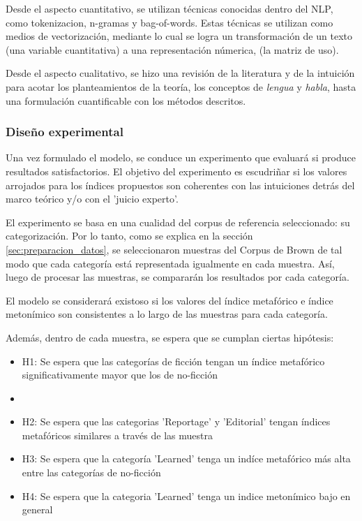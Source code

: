 \documentclass[twoside]{article}
\begin{document}
Desde el aspecto cuantitativo, se utilizan técnicas conocidas
dentro del NLP, como tokenizacion, n-gramas y  bag-of-words.
Estas técnicas se utilizan como medios de vectorización, mediante
lo cual se logra un transformación de un texto (una variable cuantitativa)
a una representación númerica, (la matriz de uso).

Desde el aspecto cualitativo, se hizo una revisión de la literatura y de la intuición
para acotar los planteamientos de la teoría, los conceptos de \emph{lengua} y \emph{habla}, hasta
una formulación cuantificable con los métodos descritos.




\subsubsection{Diseño experimental}
\label{sec:orgce47475}

Una vez formulado el modelo, se conduce un experimento que evaluará si produce resultados
satisfactorios. El objetivo del experimento es escudriñar si los valores arrojados para
los índices propuestos son coherentes con las intuiciones detrás del marco teórico y/o
con el 'juicio experto'.

El experimento se basa en una cualidad del corpus de referencia seleccionado: su categorización.
Por lo tanto, como se explica en la sección \ref{sec:preparacion_datos}, se seleccionaron
muestras del Corpus de Brown  de tal modo que cada categoría está representada igualmente
en cada muestra. Así, luego de procesar las muestras, se compararán los resultados por
cada categoría.

El modelo se considerará existoso si los valores del índice metafórico e índice metonímico
son consistentes a lo largo de las muestras para cada categoría.

Además, dentro de cada muestra, se espera que se cumplan ciertas hipótesis:

\begin{itemize}
\item H1: Se espera que las categorías de ficción tengan un índice metafórico significativamente mayor que los de no-ficción
\item 

\item H2: Se espera que las categorias 'Reportage' y 'Editorial' tengan índices metafóricos similares a través de las muestra
\item H3: Se espera que la categoría 'Learned' tenga un indíce metafórico más alta entre las categorías de no-ficción
\item H4: Se espera que la categoria 'Learned' tenga un indice metonímico bajo en general
\end{itemize}
\end{document}
